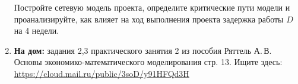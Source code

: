 \documentclass[a4paper,14pt]{extarticle}
\begin{document}
\begin{enumerate}
Постройте сетевую модель проекта, определите критические пути модели и проанализируйте, как влияет на ход выполнения проекта задержка работы $D$ на 4 недели.















%
%


\item \textbf{На дом:} задания 2,3 практического занятия 2 из пособия Ряттель А.\,В. Основы экономико-математического
моделирования стр. 13. Ищите здесь: \url{https://cloud.mail.ru/public/3soD/y91HFQd3H}

\end{enumerate}
\end{document}
